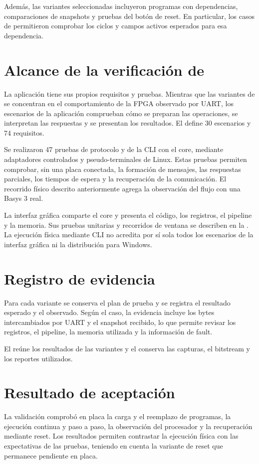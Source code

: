 Además, las variantes seleccionadas incluyeron programas con dependencias,
comparaciones de snapshots y pruebas del botón de reset. En particular, los
casos de  permitieron comprobar los ciclos y campos activos
esperados para esa dependencia.

\section{Alcance de la verificación de \texorpdfstring{}{viewrv}}

La aplicación  tiene sus propios requisitos y pruebas. Mientras
que las variantes de  se concentran en el comportamiento de
la FPGA observado por UART, los escenarios de la aplicación comprueban cómo se
preparan las operaciones, se interpretan las respuestas y se presentan los
resultados. El 
define 30 escenarios y 74 requisitos.

Se realizaron 47 pruebas de protocolo y de la CLI con el core, mediante
adaptadores controlados y pseudo-terminales de Linux. Estas pruebas permiten
comprobar, sin una placa conectada, la formación de mensajes, las respuestas
parciales, los tiempos de espera y la recuperación de la comunicación. El
recorrido físico descrito anteriormente agrega la observación del flujo con una
Basys 3 real.

La interfaz gráfica comparte el core y presenta el código, los registros, el
pipeline y la memoria. Sus pruebas unitarias y recorridos de ventana se
describen en la .
La ejecución física mediante
CLI no acredita por sí sola todos los escenarios de la interfaz gráfica ni la
distribución para Windows.

\section{Registro de evidencia}

Para cada variante se conserva el plan de prueba y se registra el resultado
esperado y el observado. Según el caso, la evidencia incluye los bytes
intercambiados por UART y el snapshot recibido, lo que permite revisar los
registros, el pipeline, la memoria utilizada y la información de fault.

El  reúne los resultados
de las variantes y el  conserva las capturas, el bitstream y los reportes utilizados.

\section{Resultado de aceptación}

La validación comprobó en placa la carga y el reemplazo de programas, la
ejecución continua y paso a paso, la observación del procesador y la
recuperación mediante reset. Los resultados permiten contrastar la ejecución
física con las expectativas de las pruebas, teniendo en cuenta la variante de
reset que permanece pendiente en placa.

